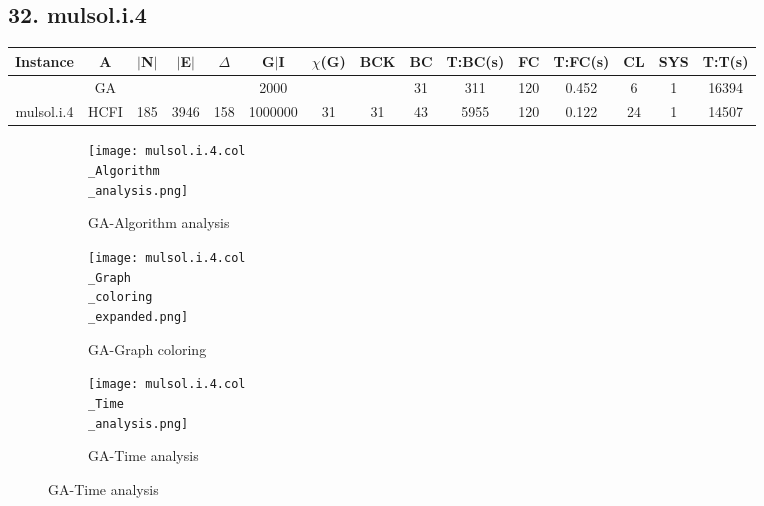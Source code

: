 \documentclass[10pt]{article}
\begin{document}
\subsection*{\hspace{0,9073976cm} 32. mulsol.i.4}
\begin{table}[H]
\centering
\begin{tabular}{|c|c|c|c|c|c|c|c|c|c|c|c|c|c|c|}
\hline
Instance& A &$|$N$|$ & $|$E$|$ & $\Delta$ & G$|$I & $\chi$(G) &BCK&BC & T:BC(s) & FC & T:FC(s) & CL & SYS & T:T(s) \\ \hline \hline

	&GA&       &                   &                     &    2000     &     \cellcolor{yellow} & {\cellcolor{yellow}}& {{\cellcolor{green}31}}
&311   &120       &0.452                   & 6                   &1          &16394        \\ \cline{2-2} \cline{6-6} \cline{9-15}
 \multirow{-2}{*}{mulsol.i.4} &HCFI   &\multirow{-2}{*}{185}   &\multirow{-2}{*}{3946}     &\multirow{-2}{*}{158}     &1000000     &\multirow{-2}{*}{\cellcolor{yellow}31}      & \multirow{-2}{*}{\cellcolor{yellow}31}    &{\cellcolor{green}43}     &5955         &120    &0.122         &24    &1     & 14507        \\ \hline
\end{tabular}
\end{table}
\graphicspath{{./Core1/Solutions/GA/mulsol.i.4.col}}
\begin{figure}[H]
\begin{subfigure}{.33\textwidth}
  \centering
  \texttt{[image: mulsol.i.4.col\\\_Algorithm\\\_analysis.png]}
  \caption{GA-Algorithm analysis}
   \label{fig:subfig1}
\end{subfigure}%
\begin{subfigure}{.33\textwidth}
  \centering
  \texttt{[image: mulsol.i.4.col\\\_Graph\\\_coloring\\\_expanded.png]}
  \caption{GA-Graph coloring}
  \label{fig:subfig2}
\end{subfigure}
\begin{subfigure}{.33\textwidth}
  \centering
  \texttt{[image: mulsol.i.4.col\\\_Time\\\_analysis.png]}
  \caption{GA-Time analysis}
  \end{subfigure}
\end{figure}
\end{document}
